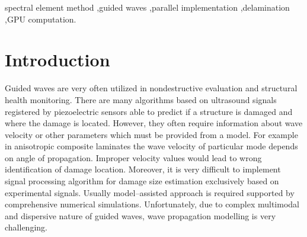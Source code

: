 \documentclass[preprint,12pt]{elsarticle}
\begin{document}
\begin{frontmatter}
		\begin{keyword}
			spectral element method \sep guided waves \sep parallel implementation \sep delamination \sep GPU computation.
			
			
		\end{keyword}
		
	\end{frontmatter}
	
	
	\section{Introduction}
	Guided waves are very often utilized in nondestructive evaluation and structural health monitoring. There are many algorithms based on ultrasound signals registered by piezoelectric sensors able to predict if a structure is damaged and where the damage is located. However, they often require information about wave velocity or other parameters which must be provided from a model. For example in anisotropic composite laminates the wave velocity of particular mode depends on angle of propagation. Improper velocity values would lead to wrong identification of damage location.  Moreover, it is very difficult to implement signal processing algorithm for damage size estimation exclusively based on experimental signals. Usually model--assisted approach is required supported by comprehensive numerical simulations. Unfortunately, due to complex multimodal and dispersive nature of guided waves, wave propagation modelling is very challenging. 
	
\end{document}
